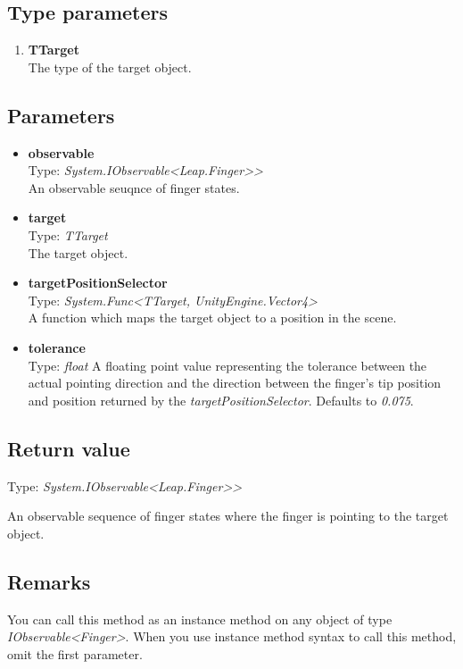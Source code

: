\documentclass[12pt,a4paper,twoside]{report}
\begin{document}
\subsection{Type parameters}
\begin{enumerate}
  \item \textbf{TTarget}\\
    The type of the target object.
\end{enumerate}

\subsection{Parameters}
\begin{itemize}
    \item \textbf{observable}\\
      Type: \textit{System.IObservable<Leap.Finger>{}>}\\
      An observable seuqnce of finger states.
    \item \textbf{target}\\
      Type: \textit{TTarget}\\
      The target object.
    \item \textbf{targetPositionSelector}\\
      Type: \textit{System.Func<TTarget, UnityEngine.Vector4>}\\
      A function which maps the target object to a position in the scene.
    \item \textbf{tolerance}\\
      Type: \textit{float}
      A floating point value representing the tolerance between the actual pointing direction and the direction between the finger's tip position and position returned by the \textit{targetPositionSelector}. Defaults to \textit{0.075}.
\end{itemize}

\subsection{Return value}
Type: \textit{System.IObservable<Leap.Finger>{}>}

An observable sequence of finger states where the finger is pointing to the target object.

\subsection{Remarks}
You can call this method as an instance method on any object of type \textit{IObservable<Finger>}. When you use instance method syntax to call this method, omit the first parameter.
\end{document}
